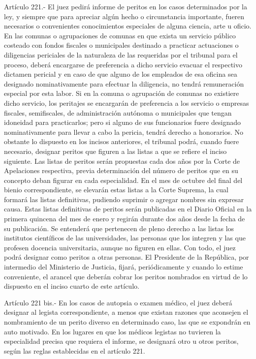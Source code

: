     Artículo 221.- El juez pedirá informe de peritos en los casos determinados por la ley, y siempre que para apreciar algún hecho o circunstancia importante, fueren necesarios o convenientes conocimientos especiales de alguna ciencia, arte u oficio.
    En las comunas o agrupaciones de comunas en que exista un servicio público costeado con fondos fiscales o municipales destinado a practicar actuaciones o diligencias periciales de la naturaleza de las requeridas por el tribunal para el proceso, deberá encargarse de preferencia a dicho servicio evacuar el respectivo dictamen pericial y en caso de que alguno de los empleados de esa oficina sea designado nominativamente para efectuar la diligencia, no tendrá remuneración especial por esta labor.
    Si en la comuna o agrupación de comunas no existiere dicho servicio, los peritajes se encargarán de preferencia a los servicio o empresas fiscales, semifiscales, de administración autónoma o municipales que tengan idoneidad para practicarlos; pero si alguno de sus funcionarios fuere designado nominativamente para llevar a cabo la pericia, tendrá derecho a honorarios.
    No obstante lo dispuesto en los incisos anteriores, el tribunal podrá, cuando fuere necesario, designar peritos que figuren a las listas a que se refiere el inciso siguiente.
    Las listas de peritos serán propuestas cada dos años por la Corte de Apelaciones respectiva, previa determinación del número de peritos que en su concepto deban figurar en cada especialidad.
    En el mes de octubre del final del bienio correspondiente, se elevarán estas listas a la Corte Suprema, la cual formará las listas definitivas, pudiendo suprimir o agregar nombres sin expresar causa.
    Estas listas definitivas de peritos serán publicadas en el Diario Oficial en la primera quincena del mes de enero y regirán durante dos años desde la fecha de su publicación.
    Se entenderá que pertenecen de pleno derecho a las listas los institutos científicos de las universidades, las personas que los integren y las que profesen docencia universitaria, aunque no figuren en ellas.
    Con todo, el juez podrá designar como peritos a otras personas.
    El Presidente de la República, por intermedio del Ministerio de Justicia, fijará, periódicamente y cuando lo estime conveniente, el arancel que deberán cobrar los peritos nombrados en virtud de lo dispuesto en el inciso cuarto de este artículo.

    Artículo 221 bis.- En los casos de autopsia o examen médico, el juez deberá designar al legista correspondiente, a menos que existan razones que aconsejen el nombramiento de un perito diverso en determinado caso, las que se expondrán en auto motivado.
    En los lugares en que los médicos legistas no tuvieren la especialidad precisa que requiera el informe, se designará otro u otros peritos, según las reglas establecidas en el artículo 221.

